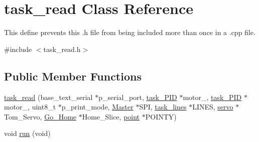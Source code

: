\hypertarget{classtask__read}{\section{task\-\_\-read Class Reference}
\label{classtask__read}
}


This define prevents this .h file from being included more than once in a .cpp file.  




{\ttfamily \#include $<$task\-\_\-read.\-h$>$}

\subsection*{Public Member Functions}
\begin{DoxyCompactItemize}
\item 
\hyperlink{classtask__read_a6e7da4895a28c1cbb2572364a15fdaff}{task\-\_\-read} (base\-\_\-text\-\_\-serial $\ast$p\-\_\-serial\-\_\-port, \hyperlink{classtask___p_i_d}{task\-\_\-\-P\-I\-D} $\ast$motor\-\_, \hyperlink{classtask___p_i_d}{task\-\_\-\-P\-I\-D} $\ast$motor\-\_, uint8\-\_\-t $\ast$p\-\_\-print\-\_\-mode, \hyperlink{class_master}{Master} $\ast$S\-P\-I, \hyperlink{classtask__lines}{task\-\_\-lines} $\ast$L\-I\-N\-E\-S, \hyperlink{classservo}{servo} $\ast$Tom\-\_\-\-Servo, \hyperlink{class_go___home}{Go\-\_\-\-Home} $\ast$Home\-\_\-\-Slice, \hyperlink{classpoint}{point} $\ast$P\-O\-I\-N\-T\-Y)
\item 
void \hyperlink{classtask__read_af2face98d4feb25a296ab079706d41fd}{run} (void)
\end{DoxyCompactItemize}
